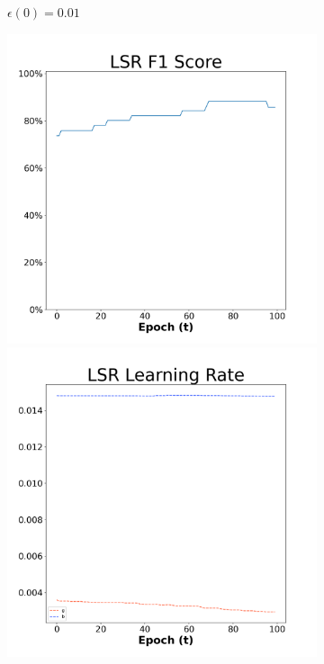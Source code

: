 \begin{figure}[H]
\begin{subfigure}{0.3\textwidth}
  \caption{$\epsilon(0)=0.01$}
\end{subfigure}\hfil %
\begin{subfigure}{0.3\textwidth}
  \includegraphics[width=\linewidth]{images/exper2/Ionosphere/LSR_0.03_f1.png}
  \includegraphics[width=\linewidth]{images/exper2/Ionosphere/LSR_0.03_lr.png}

\end{subfigure}
\end{figure}
